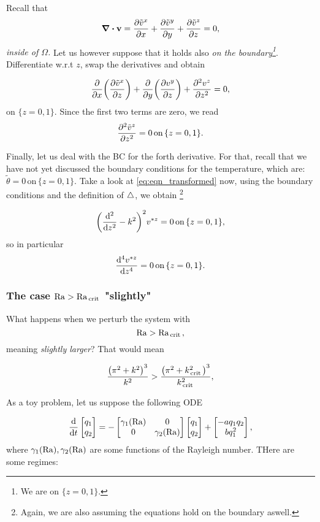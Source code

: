 \documentclass[reqno, a4paper]{article}
\begin{document}
Recall that
\[
	\divergence{\vb{v}} = \pdv{\tilde{v}^x}{x}+ \pdv{\tilde{v}^y}{y} + \pdv{\tilde{v}^z}{z} = 0,
\]
\textit{inside of $\Omega$.} Let us however suppose that it holds also \textit{on the boundary\footnote{We are on $\{z = 0,1\}$.}}. Differentiate w.r.t $z$, swap the derivatives and obtain

\[
	\pdv{x}\qty(\pdv{\tilde{v}^x}{z})+\pdv{y}\qty(\pdv{v^y}{z})+\pdv[2]{v^z}{z} = 0,
\]
on $\{z = 0,1\}.$ Since the first two terms are zero, we read
\[
	\pdv[2]{\tilde{v}^z}{z} = 0 \, \text{on} \, \{z = 0,1\}.
\]

Finally, let us deal with the BC for the forth derivative. For that, recall that we have not yet discussed the boundary conditions for the temperature, which are: $\tilde{\theta} = 0 \, \text{on} \, \{z = 0,1\}.$ Take a look at \ref{eq:eqn_transformed} now, using the boundary conditions and the definition of $\operatorname{\bigtriangleup}$, we obtain \footnote{Again, we are also assuming the equations hold on the boundary aswell.}

\[
	\qty(\dv[2]{z}-k^{2})^{2}v^{*z} = 0 \, \text{on} \, \{z = 0,1\},
\]
so in particular
\[
	\dv[4]{v^{*z}}{z} = 0 \, \text{on} \, \{z = 0,1\}.
\]

\subsubsection{The case $\mathrm{Ra} > \mathrm{Ra}_{\, \text{crit} \,}$ "slightly"}
\label{sec:r>r_crit}

What happens when we perturb the system with
\[
	\mathrm{Ra} > \mathrm{Ra}_{\, \text{crit} \,},
\]
meaning \textit{slightly larger}? That would mean

\[
	\frac{\qty(\pi^{2}+k^{2})^{3}}{k^{2}}>\frac{\qty(\pi^{2}+k_{\, \text{crit} \,}^{2})^{3}}{k_{\, \text{crit} \,}^{2}},
\]


As a toy problem, let us suppose the following ODE

\[
	\dv{t} \begin{bmatrix}
		q_1 \\
		q_2
	\end{bmatrix}
	= - \begin{bmatrix}
		\gamma_1\qty(\mathrm{Ra}) & 0 \\
		0 & \gamma_2\qty(\mathrm{Ra})
	\end{bmatrix}
	\begin{bmatrix}
		q_1 \\
		q_2
	\end{bmatrix}
	+
	\begin{bmatrix}
		-a q_1 q_2 \\
		b q_1^{2}
	\end{bmatrix},
\]
where $\gamma_1\qty(\mathrm{Ra}), \gamma_2\qty(\mathrm{Ra})$ are some functions of the Rayleigh number. THere are some regimes:
\end{document}
